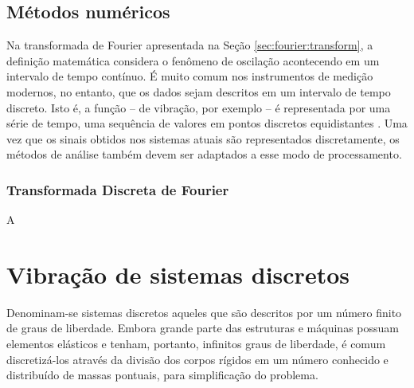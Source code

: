 \documentclass[12pt,openright,oneside,a4paper,
	chapter=TITLE,section=TITLE,
	english,brazil]{abntex2}
\begin{document}
	\subsection{Métodos numéricos}
	Na transformada de Fourier apresentada na Seção \ref{sec:fourier:transform}, a definição matemática considera o fenômeno de oscilação acontecendo em um intervalo de tempo contínuo. É muito comum nos instrumentos de medição modernos, no entanto, que os dados sejam descritos em um intervalo de tempo discreto. Isto é, a função -- de vibração, por exemplo -- é representada por uma série de tempo, uma sequência de valores em pontos discretos equidistantes \cite{dimarogonas:1995}. Uma vez que os sinais obtidos nos sistemas atuais são representados discretamente, os métodos de análise também devem ser adaptados a esse modo de processamento.
	
	\subsubsection{Transformada Discreta de Fourier}
	A 
	
	\section{Vibração de sistemas discretos}
	Denominam-se sistemas discretos aqueles que são descritos por um número finito de graus de liberdade. Embora grande parte das estruturas e máquinas possuam elementos elásticos e tenham, portanto, infinitos graus de liberdade, é comum discretizá-los através da divisão dos corpos rígidos em um número conhecido e distribuído de massas pontuais, para simplificação do problema. 
	
\end{document}
